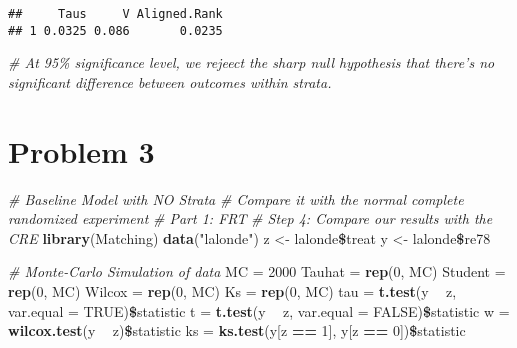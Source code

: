 \documentclass[]{article}
\newenvironment{Shaded}{\begin{snugshade}}{\end{snugshade}}
\newcommand{\KeywordTok}[1]{\textcolor[rgb]{0.13,0.29,0.53}{\textbf{#1}}}
\newcommand{\DataTypeTok}[1]{\textcolor[rgb]{0.13,0.29,0.53}{#1}}
\newcommand{\DecValTok}[1]{\textcolor[rgb]{0.00,0.00,0.81}{#1}}
\newcommand{\StringTok}[1]{\textcolor[rgb]{0.31,0.60,0.02}{#1}}
\newcommand{\CommentTok}[1]{\textcolor[rgb]{0.56,0.35,0.01}{\textit{#1}}}
\newcommand{\OtherTok}[1]{\textcolor[rgb]{0.56,0.35,0.01}{#1}}
\newcommand{\OperatorTok}[1]{\textcolor[rgb]{0.81,0.36,0.00}{\textbf{#1}}}
\newcommand{\NormalTok}[1]{#1}
\begin{document}
\begin{verbatim}
##     Taus     V Aligned.Rank
## 1 0.0325 0.086       0.0235
\end{verbatim}

\begin{Shaded}
\begin{Highlighting}[]
\CommentTok{# At 95\% significance level, we rejeect the sharp null hypothesis that there's no significant difference between outcomes within strata.}
\end{Highlighting}
\end{Shaded}

\section*{Problem 3}

\begin{Shaded}
\begin{Highlighting}[]
\CommentTok{# Baseline Model with NO Strata}
\CommentTok{# Compare it with the normal complete randomized experiment}
\CommentTok{# Part 1: FRT}
\CommentTok{# Step 4: Compare our results with the CRE}
\KeywordTok{library}\NormalTok{(Matching)}
\KeywordTok{data}\NormalTok{(}\StringTok{"lalonde"}\NormalTok{)}
\NormalTok{z <-}\StringTok{ }\NormalTok{lalonde}\OperatorTok{\$}\NormalTok{treat}
\NormalTok{y <-}\StringTok{ }\NormalTok{lalonde}\OperatorTok{\$}\NormalTok{re78}

\CommentTok{# Monte-Carlo Simulation of data}
\NormalTok{MC =}\StringTok{ }\DecValTok{2000}
\NormalTok{Tauhat   =}\StringTok{ }\KeywordTok{rep}\NormalTok{(}\DecValTok{0}\NormalTok{, MC)}
\NormalTok{Student  =}\StringTok{ }\KeywordTok{rep}\NormalTok{(}\DecValTok{0}\NormalTok{, MC)}
\NormalTok{Wilcox   =}\StringTok{ }\KeywordTok{rep}\NormalTok{(}\DecValTok{0}\NormalTok{, MC)}
\NormalTok{Ks       =}\StringTok{ }\KeywordTok{rep}\NormalTok{(}\DecValTok{0}\NormalTok{, MC)}
\NormalTok{tau =}\StringTok{ }\KeywordTok{t.test}\NormalTok{(y }\OperatorTok{~}\StringTok{ }\NormalTok{z, }\DataTypeTok{var.equal =} \OtherTok{TRUE}\NormalTok{)}\OperatorTok{\$}\NormalTok{statistic}
\NormalTok{t =}\StringTok{ }\KeywordTok{t.test}\NormalTok{(y }\OperatorTok{~}\StringTok{ }\NormalTok{z, }\DataTypeTok{var.equal =} \OtherTok{FALSE}\NormalTok{)}\OperatorTok{\$}\NormalTok{statistic}
\NormalTok{w =}\StringTok{ }\KeywordTok{wilcox.test}\NormalTok{(y }\OperatorTok{~}\StringTok{ }\NormalTok{z)}\OperatorTok{\$}\NormalTok{statistic }
\NormalTok{ks =}\StringTok{ }\KeywordTok{ks.test}\NormalTok{(y[z }\OperatorTok{==}\StringTok{ }\DecValTok{1}\NormalTok{], y[z }\OperatorTok{==}\StringTok{ }\DecValTok{0}\NormalTok{])}\OperatorTok{\$}\NormalTok{statistic}


\end{Highlighting}
\end{Shaded}
\end{document}
